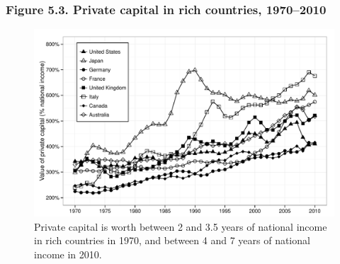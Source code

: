 \documentclass[t]{beamer}\usepackage[]{graphicx}\usepackage[]{color}
\newenvironment{knitrout}{}{} %
\begin{document}
\begin{frame}[label=Figure_5_3]
\frametitle{Figure 5.3. Private capital in rich countries, 1970--2010}
\begin{figure}[t]
\begin{minipage}[b]{\textwidth}
\centering
\begin{knitrout}\footnotesize
{}\color{fgcolor}

{\centering \includegraphics[width=1\linewidth]{figures/bw/Figure_5_3} 

}



\end{knitrout}
\caption{Private capital is worth between 2 and 3.5 years of national income in rich countries in 1970, and between 4 and 7 years of national income in 2010.}
\end{minipage}
\end{figure}
\end{frame}
\end{document}
